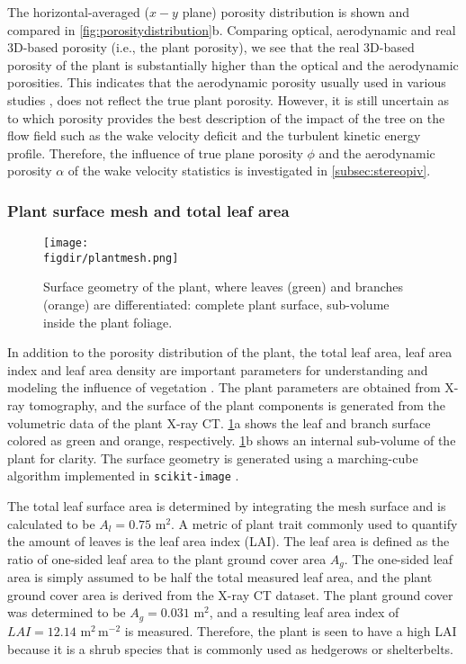 The horizontal-averaged ($x-y$ plane) porosity distribution is shown and compared in \cref{fig:porositydistribution}b. Comparing optical, aerodynamic and real 3D-based porosity (i.e., the plant porosity), we see that the real 3D-based porosity of the plant is substantially higher than the optical and the aerodynamic porosities. This indicates that the aerodynamic porosity usually used in various studies \citep{Bitog2011b,Guan2003,Manickathan2018b}, does not reflect the true plant porosity. However, it is still uncertain as to which porosity provides the best description of the impact of the tree on the flow field such as the wake velocity deficit and the turbulent kinetic energy profile. Therefore, the influence of true plane porosity $\phi$ and the aerodynamic porosity $\alpha$ of the wake velocity statistics is investigated in \cref{subsec:stereopiv}.

\subsubsection*{Plant surface mesh and total leaf area}

\begin{figure}[t]
	\centering
	\texttt{[image: \\figdir/plantmesh.png]}
	\caption{Surface geometry of the plant, where leaves (green) and branches (orange) are differentiated:  complete plant surface,  sub-volume inside the plant foliage.}
	\label{fig:plantmesh}
\end{figure}

In addition to the porosity distribution of the plant, the total leaf area, leaf area index and leaf area density are important parameters for understanding and modeling the influence of vegetation \citep{Manickathan2018a}. The plant parameters are obtained from X-ray tomography, and the surface of the plant components is generated from the volumetric data of the plant X-ray CT. \cref{fig:plantmesh}a shows the leaf and branch surface colored as green and orange, respectively. \cref{fig:plantmesh}b shows an internal sub-volume of the plant for clarity. The surface geometry is generated using a marching-cube algorithm implemented in \texttt{scikit-image} \citep{VanderWalt2014a}.

The total leaf surface area is determined by integrating the mesh surface and is calculated to be $A_l=0.75$ m$^2$. A metric of plant trait commonly used to quantify the amount of leaves is the leaf area index (LAI). The leaf area is defined as the ratio of one-sided leaf area to the plant ground cover area $A_g$. The one-sided leaf area is simply assumed to be half the total measured leaf area, and the plant ground cover area is derived from the X-ray CT dataset. The plant ground cover was determined to be $A_g=0.031$ m$^2$, and a resulting leaf area index of $\textit{LAI}=12.14$ m$^2$\,m$^{-2}$ is measured. Therefore, the plant is seen to have a high LAI because it is a shrub species that is commonly used as hedgerows or shelterbelts.

